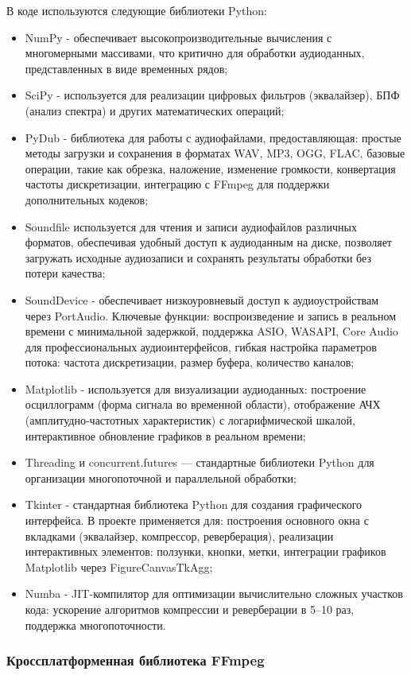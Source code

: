 В коде используются следующие библиотеки Python:
\begin{itemize}
	\item NumPy - обеспечивает высокопроизводительные вычисления с многомерными массивами, что критично для обработки аудиоданных, представленных в виде временных рядов;
	\item SciPy - используется для реализации цифровых фильтров (эквалайзер), БПФ (анализ спектра) и других математических операций;
	\item PyDub - библиотека для работы с аудиофайлами, предоставляющая: простые методы загрузки и сохранения в форматах WAV, MP3, OGG, FLAC, базовые операции, такие как обрезка, наложение, изменение громкости, конвертация частоты дискретизации, интеграцию с FFmpeg для поддержки дополнительных кодеков;
	\item Soundfile используется для чтения и записи аудиофайлов различных форматов, обеспечивая удобный доступ к аудиоданным на диске, позволяет загружать исходные аудиозаписи и сохранять результаты обработки без потери качества;
	\item SoundDevice - обеспечивает низкоуровневый доступ к аудиоустройствам через PortAudio. Ключевые функции: воспроизведение и запись в реальном времени с минимальной задержкой, поддержка ASIO, WASAPI, Core Audio для профессиональных аудиоинтерфейсов, гибкая настройка параметров потока: частота дискретизации, размер буфера, количество каналов;
	\item Matplotlib - используется для визуализации аудиоданных: построение осциллограмм (форма сигнала во временной области), отображение АЧХ (амплитудно-частотных характеристик) с логарифмической шкалой, интерактивное обновление графиков в реальном времени;
	\item Threading и concurrent.futures — стандартные библиотеки Python для организации многопоточной и параллельной обработки;
	\item Tkinter - стандартная библиотека Python для создания графического интерфейса. В проекте применяется для: построения основного окна с вкладками (эквалайзер, компрессор, реверберация), реализации интерактивных элементов: ползунки, кнопки, метки, интеграции графиков Matplotlib через FigureCanvasTkAgg;
	\item Numba - JIT-компилятор для оптимизации вычислительно сложных участков кода: ускорение алгоритмов компрессии и реверберации в 5–10 раз, поддержка многопоточности.
\end{itemize}

\subsubsection{Кроссплатформенная библиотека FFmpeg}

